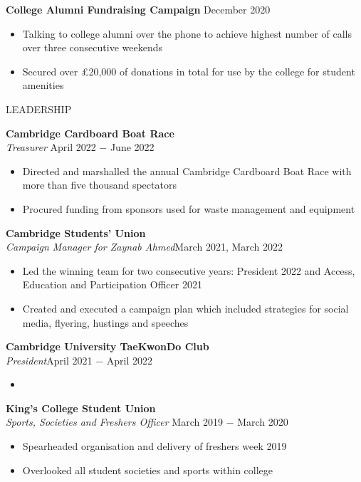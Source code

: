 \documentclass{article}
\begin{document}
\textbf{College Alumni Fundraising Campaign} \hfill December 2020
\begin{itemize}
    \item Talking to college alumni over the phone to achieve highest number of calls over three consecutive weekends
    \item Secured over £20,000 of donations in total for use by the college for student amenities
\end{itemize} \medskip

\uppercase{Leadership}

\textbf{Cambridge Cardboard Boat Race} \\
\textit{Treasurer} \hfill April 2022 $-$ June 2022
\begin{itemize}
    \item Directed and marshalled the annual Cambridge Cardboard Boat Race with more than five thousand spectators
    \item Procured funding from sponsors used for waste management and equipment
\end{itemize} \medskip

\textbf{Cambridge Students' Union} \\
\textit{Campaign Manager for Zaynab Ahmed}\hfill March 2021, March 2022
\begin{itemize}
    \item Led the winning team for two consecutive years: President 2022 and Access, Education and Participation Officer 2021
    \item Created and executed a campaign plan which included strategies for social media, flyering, hustings and speeches
\end{itemize} \medskip

\textbf{Cambridge University TaeKwonDo Club} \\
\textit{President}\hfill April 2021 $-$ April 2022
\begin{itemize}
    \item 
\end{itemize} \medskip

\textbf{King's College Student Union} \\
\textit{Sports, Societies and Freshers Officer }\hfill March 2019 $-$ March 2020
\begin{itemize}
    \item Spearheaded organisation and delivery of freshers week 2019
    \item Overlooked all student societies and sports within college
\end{itemize} \medskip
\end{document}
